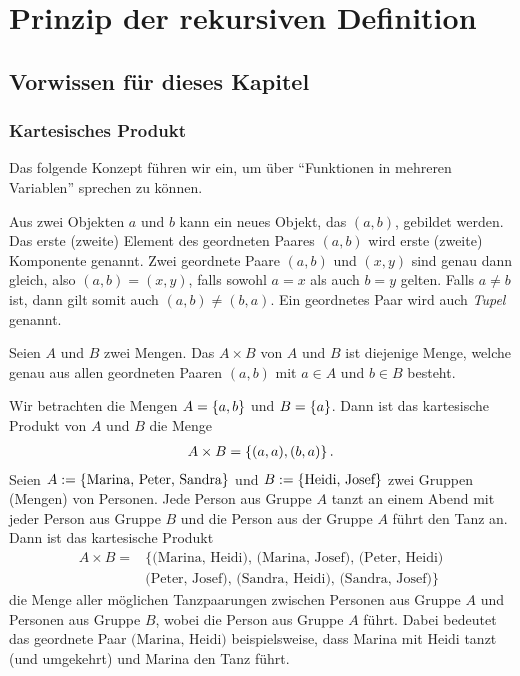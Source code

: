 \chapter{Prinzip der rekursiven Definition}\label{ch:Appendix}

\section{Vorwissen für dieses Kapitel}
\subsection{Kartesisches Produkt}
Das folgende Konzept führen wir ein, um über \enquote{Funktionen in mehreren Variablen} sprechen zu können.

Aus zwei Objekten $a$ und $b$ kann ein neues Objekt, das  $(a,b)$, gebildet werden. Das erste (zweite) Element des geordneten Paares $(a,b)$ wird erste (zweite) Komponente genannt. Zwei geordnete Paare $(a,b)$ und $(x,y)$ sind genau dann gleich, also $(a,b)=(x,y)$, falls sowohl $a=x$ als auch $b=y$ gelten. Falls $a\neq b$ ist, dann gilt somit auch $(a,b)\neq (b,a)$. Ein geordnetes Paar wird auch \textit{Tupel} genannt.

Seien $A$ und $B$ zwei Mengen. Das  $A\times B$ von $A$ und $B$ ist diejenige Menge, welche genau aus allen geordneten Paaren $(a,b)$ mit $a\in A$ und $b\in B$ besteht.

\beispiele{-}
{}
{
Wir betrachten die Mengen $A = \left\{a,b\right\}$ und $B = \left\{a\right\}$. Dann ist das kartesische Produkt von $A$ und $B$ die Menge
\begin{align*}
    A\times B = \left\{(a,a), (b,a)\right\}.
\end{align*}
}
{
Seien $A:=\left\{\text{Marina, Peter, Sandra}\right\}$ und $B:=\left\{\text{Heidi, Josef}\right\}$ zwei Gruppen (Mengen) von Personen. Jede Person aus Gruppe $A$ tanzt an einem Abend mit jeder Person aus Gruppe $B$ und die Person aus der Gruppe $A$ führt den Tanz an. Dann ist das kartesische Produkt 
\begin{equation*}
\begin{split}
    A\times B = &\{ \text{(Marina, Heidi), (Marina, Josef), (Peter, Heidi)}\\
    &\text{(Peter, Josef), (Sandra, Heidi), (Sandra, Josef)} \}
\end{split}
\end{equation*}
die Menge aller möglichen Tanzpaarungen zwischen Personen aus Gruppe $A$ und Personen aus Gruppe $B$, wobei die Person aus Gruppe $A$ führt. Dabei bedeutet das geordnete Paar $\text{(Marina, Heidi)}$ beispielsweise, dass Marina mit Heidi tanzt (und umgekehrt) und Marina den Tanz führt.
}

